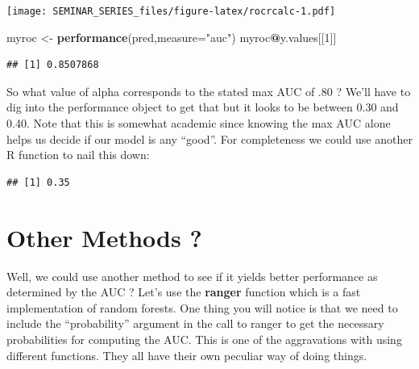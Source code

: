 \documentclass[]{book}
\newenvironment{Shaded}{\begin{snugshade}}{\end{snugshade}}
\newcommand{\KeywordTok}[1]{\textcolor[rgb]{0.13,0.29,0.53}{\textbf{#1}}}
\newcommand{\DataTypeTok}[1]{\textcolor[rgb]{0.13,0.29,0.53}{#1}}
\newcommand{\DecValTok}[1]{\textcolor[rgb]{0.00,0.00,0.81}{#1}}
\newcommand{\StringTok}[1]{\textcolor[rgb]{0.31,0.60,0.02}{#1}}
\newcommand{\OtherTok}[1]{\textcolor[rgb]{0.56,0.35,0.01}{#1}}
\newcommand{\OperatorTok}[1]{\textcolor[rgb]{0.81,0.36,0.00}{\textbf{#1}}}
\newcommand{\NormalTok}[1]{#1}
\begin{document}
\texttt{[image: SEMINAR\_SERIES\_files/figure-latex/rocrcalc-1.pdf]}

\begin{Shaded}
\begin{Highlighting}[]
\NormalTok{myroc <-}\StringTok{ }\KeywordTok{performance}\NormalTok{(pred,}\DataTypeTok{measure=}\StringTok{"auc"}\NormalTok{)}
\NormalTok{myroc}\OperatorTok{@}\NormalTok{y.values[[}\DecValTok{1}\NormalTok{]]}
\end{Highlighting}
\end{Shaded}

\begin{verbatim}
## [1] 0.8507868
\end{verbatim}

So what value of alpha corresponds to the stated max AUC of .80 ? We'll
have to dig into the performance object to get that but it looks to be
between 0.30 and 0.40. Note that this is somewhat academic since knowing
the max AUC alone helps us decide if our model is any ``good''. For
completeness we could use another R function to nail this down:

\begin{Shaded}
\end{Shaded}

\begin{verbatim}
## [1] 0.35
\end{verbatim}

\chapter{Other Methods ?}\label{other-methods}

Well, we could use another method to see if it yields better performance
as determined by the AUC ? Let's use the \textbf{ranger} function which
is a fast implementation of random forests. One thing you will notice is
that we need to include the ``probability'' argument in the call to
ranger to get the necessary probabilities for computing the AUC. This is
one of the aggravations with using different functions. They all have
their own peculiar way of doing things.
\end{document}
